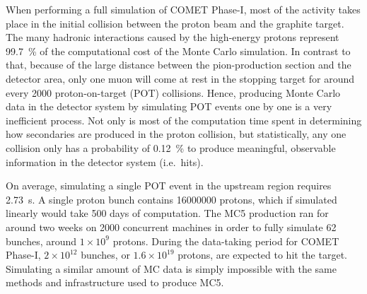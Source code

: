 When performing a full simulation of COMET Phase-I, most of the activity takes place in the initial collision between the proton beam and the graphite target. The many hadronic interactions caused by the high-energy protons represent \SI{99.7}{\percent} of the computational cost of the Monte Carlo simulation.
In contrast to that, because of the large distance between the pion-production section and the detector area, only one muon will come at rest in the stopping target for around every \num{2000} proton-on-target (POT) collisions. Hence, producing Monte Carlo data in the detector system by simulating POT events one by one is a very inefficient process. Not only is most of the computation time spent in determining how secondaries are produced in the proton collision, but statistically, any one collision only has a probability of \SI{0.12}{\percent} to produce meaningful, observable information in the detector system (i.e.\ hits).

On average, simulating a single POT event in the upstream region requires \SI{2.73}{\second}. A single proton bunch contains \num{16000000} protons, which if simulated linearly would take 500 days of computation. The MC5 production ran for around two weeks on 2000 concurrent machines in order to fully simulate 62 bunches, around $1\times10^9$ protons. During the data-taking period for COMET Phase-I, $2\times10^{12}$ bunches, or $1.6\times 10^{19}$ protons, are expected to hit the target. Simulating a similar amount of MC data is simply impossible with the same methods and infrastructure used to produce MC5.

